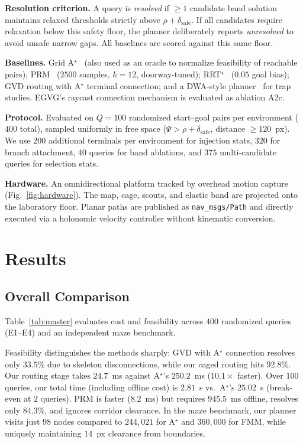 \documentclass[conference]{IEEEtran}
\begin{document}
\textbf{Resolution criterion.} A query is \emph{resolved} if $\ge 1$ candidate band solution maintains relaxed thresholds strictly above $\rho+\delta_{\mathrm{safe}}$. If all candidates require relaxation below this safety floor, the planner deliberately reports \emph{unresolved} to avoid unsafe narrow gaps. All baselines are scored against this same floor.

\textbf{Baselines.} Grid A$^\star$~\cite{hart1968} (also used as an oracle to normalize feasibility of reachable pairs); PRM~\cite{kavraki1996} ($2500$ samples, $k=12$, doorway-tuned); RRT$^\star$~\cite{karaman2011} ($0.05$ goal bias); GVD routing with A$^\star$ terminal connection; and a DWA-style planner~\cite{fox1997} for trap studies. EGVG's raycast connection mechanism is evaluated as ablation A2c.

\textbf{Protocol.} Evaluated on $Q=100$ randomized start--goal pairs per environment ($400$ total), sampled uniformly in free space ($\Psi>\rho+\delta_{\mathrm{safe}}$, distance $\ge 120$~px). We use $200$ additional terminals per environment for injection stats, $320$ for branch attachment, $40$ queries for band ablations, and $375$ multi-candidate queries for selection stats.

\textbf{Hardware.} An omnidirectional platform tracked by overhead motion capture (Fig.~\ref{fig:hardware}). The map, cage, scouts, and elastic band are projected onto the laboratory floor. Planar paths are published as \texttt{nav\_msgs/Path} and directly executed via a holonomic velocity controller without kinematic conversion.

\section{Results}
\label{sec:results}

\subsection{Overall Comparison}

Table~\ref{tab:master} evaluates cost and feasibility across $400$ randomized queries (E1--E4) and an independent maze benchmark.

Feasibility distinguishes the methods sharply: GVD with A$^\star$ connection resolves only $33.5\%$ due to skeleton disconnections, while our caged routing hits $92.8\%$. Our routing stage takes $24.7$~ms against A$^\star$'s $250.2$~ms ($10.1\times$ faster). Over $100$ queries, our total time (including offline cost) is $2.81$~s vs.\ A$^\star$'s $25.02$~s (break-even at $2$ queries). PRM is faster ($8.2$~ms) but requires $945.5$~ms offline, resolves only $84.3\%$, and ignores corridor clearance. In the maze benchmark, our planner visits just $98$ nodes compared to $244{,}021$ for A$^\star$ and $360{,}000$ for FMM, while uniquely maintaining $14$~px clearance from boundaries.
\end{document}
